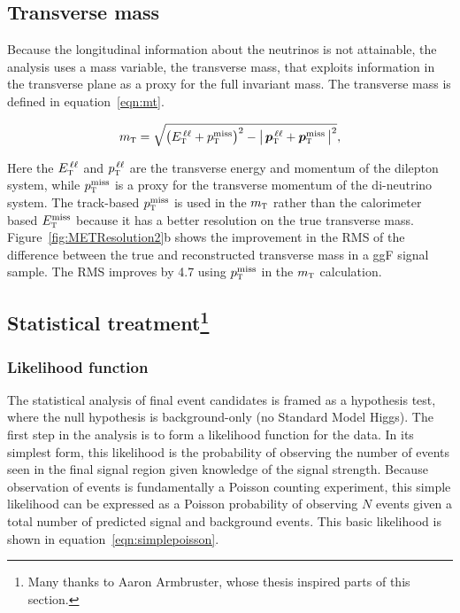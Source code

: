 \subsection{Transverse mass}
\label{sec:mt}
Because the longitudinal information about the neutrinos is not attainable, the \HWWfull analysis uses a mass variable, the transverse mass, that exploits information in the transverse plane as a proxy for the full invariant mass. The transverse mass is defined in equation~\ref{eqn:mt}.

\begin{equation}
  m_{\textrm{\footnotesize\sc t}} = \sqrt{\left(E_{\textrm{\footnotesize\sc t}}^{\,\ell\ell} + p_{\textrm{\footnotesize\sc t}}^{\rm miss}\right)^2 - \left|\,\hbox{\bm{$p$}}_{\textrm{\footnotesize\sc t}}^{\,\ell\ell} + \hbox{\bm{$p$}}_{\textrm{\footnotesize\sc t}}^{\rm miss}\,\right|^2},
\label{eqn:mt}
\end{equation}

Here the $E_{\textrm{\footnotesize\sc t}}^{\,\ell\ell}$ and $p_{\textrm{\footnotesize\sc t}}^{\,\ell\ell}$ are the transverse energy and momentum of the dilepton system, while $p_{\textrm{\footnotesize\sc t}}^{\rm miss}$ is a proxy for the transverse momentum of the di-neutrino system. The track-based $p_{\textrm{\footnotesize\sc t}}^{\rm miss}$ is used in the $m_{\textrm{\footnotesize\sc t}}$ rather than the calorimeter based $E_{\textrm{\footnotesize\sc t}}^{\rm miss}$ because it has a better resolution on the true transverse mass. Figure~\ref{fig:METResolution2}b shows the improvement in the RMS of the difference between the true and reconstructed transverse mass in a ggF signal sample. The RMS improves by 4.7 \GeV using $p_{\textrm{\footnotesize\sc t}}^{\rm miss}$ in the $m_{\textrm{\footnotesize\sc t}}$ calculation.

\subsection[title]{Statistical treatment\footnote{Many thanks to Aaron Armbruster, whose thesis\cite{ArmbrusterThesis} inspired parts of this section.}} 

\subsubsection{Likelihood function}

The statistical analysis of final event candidates is framed as a hypothesis test, where the null hypothesis is background-only (no Standard Model Higgs). The first step in the analysis is to form a likelihood function for the data. In its simplest form, this likelihood is the probability of observing the number of events seen in the final signal region given knowledge of the signal strength. Because observation of events is fundamentally a Poisson counting experiment, this simple likelihood can be expressed as a Poisson probability of observing $N$ events given a total number of predicted signal and background events. This basic likelihood is shown in equation~\ref{eqn:simplepoisson}.

